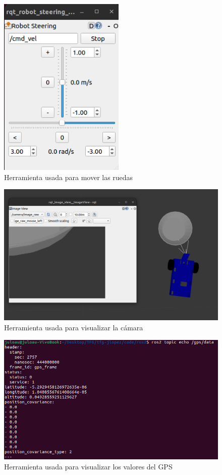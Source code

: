  \begin{figure} [h!]
	\begin{center}
		\includegraphics[width=6cm]{figs/cap6/steering.png}
	\end{center}
	\caption{Herramienta usada para mover las ruedas}
	\label{fig:steering}
\end{figure}

 \begin{figure} [h!]
	\begin{center}
		\includegraphics[width=12cm]{figs/cap6/rqtimage.png}
	\end{center}
	\caption{Herramienta usada para visualizar la cámara}
	\label{fig:rqtimage}
\end{figure}

 \begin{figure} [h!]
	\begin{center}
		\includegraphics[width=12cm]{figs/cap6/echogps.png}
	\end{center}
	\caption{Herramienta usada para visualizar los valores del GPS}
	\label{fig:echogps}
\end{figure}


